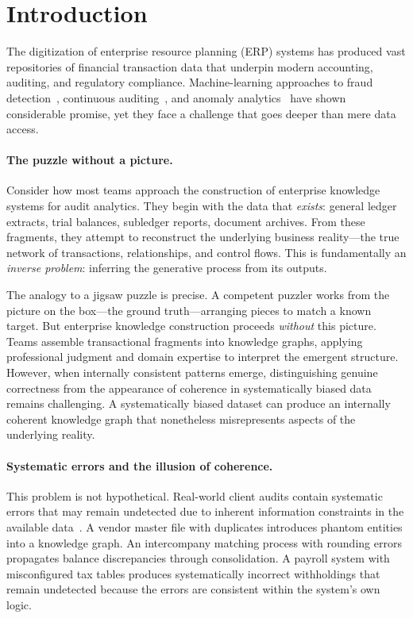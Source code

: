 \section{Introduction}
\label{sec:introduction}

The digitization of enterprise resource planning (ERP) systems has
produced vast repositories of financial transaction data that underpin
modern accounting, auditing, and regulatory
compliance.  Machine-learning approaches to fraud
detection~\citep{west2016intelligent,hilal2022financial}, continuous
auditing~\citep{vasarhelyi2004principles}, and anomaly
analytics~\citep{schreyer2017detection} have shown considerable promise,
yet they face a challenge that goes deeper than mere data access.

\paragraph{The puzzle without a picture.}
Consider how most teams approach the construction of enterprise knowledge
systems for audit analytics.  They begin with the data that \emph{exists}:
general ledger extracts, trial balances, subledger reports, document
archives.  From these fragments, they attempt to reconstruct the
underlying business reality---the true network of transactions,
relationships, and control flows.  This is fundamentally an
\emph{inverse problem}: inferring the generative process from its
outputs.

The analogy to a jigsaw puzzle is precise.  A competent puzzler works
from the picture on the box---the ground truth---arranging pieces to
match a known target.  But enterprise knowledge construction proceeds
\emph{without} this picture.  Teams assemble transactional fragments
into knowledge graphs, applying professional judgment and domain expertise
to interpret the emergent structure.  However, when internally consistent
patterns emerge, distinguishing genuine correctness from the appearance of
coherence in systematically biased data remains challenging.  A
systematically biased dataset can produce an internally coherent knowledge
graph that nonetheless misrepresents aspects of the underlying reality.

\paragraph{Systematic errors and the illusion of coherence.}
This problem is not hypothetical.  Real-world client audits contain
systematic errors that may remain undetected due to inherent information
constraints in the available data~\citep{nigrini2012benfords,guo2022picture}.  A vendor master file
with duplicates introduces phantom entities into a knowledge graph.
An intercompany matching process with rounding errors propagates
balance discrepancies through consolidation.  A payroll system with
misconfigured tax tables produces systematically incorrect withholdings
that remain undetected because the errors are consistent within the
system's own logic.

